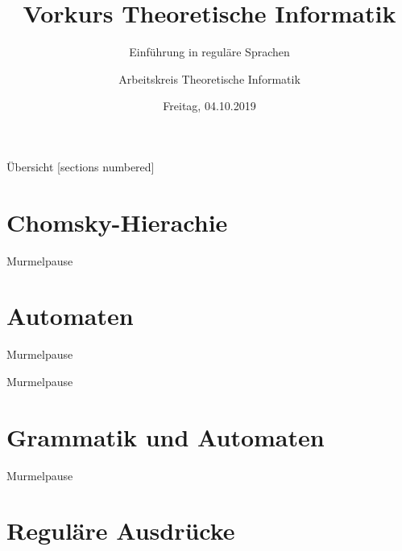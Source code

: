 

\title{Vorkurs Theoretische Informatik}
\subtitle{Einführung in reguläre Sprachen}
\date{Freitag, 04.10.2019}
\author{Arbeitskreis Theoretische Informatik}



\maketitle

\begin{frame}[fragile]{Übersicht}
  [sections numbered]
  \tableofcontents%
\end{frame}


\section{Chomsky-Hierachie}



\begin{frame}[standout]
  Murmelpause
\end{frame}

\section{Automaten}



\begin{frame}[standout]
  Murmelpause
\end{frame}



\begin{frame}[standout]
  Murmelpause
\end{frame}

\section{Grammatik und Automaten}



\begin{frame}[standout]
  Murmelpause
\end{frame}

\section{Reguläre Ausdrücke}

